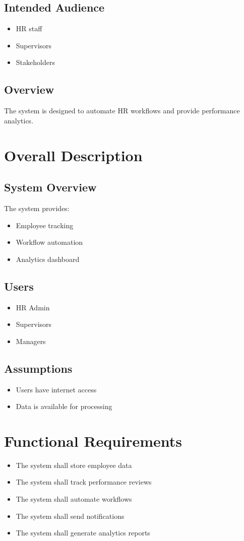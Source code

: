 \documentclass[12pt]{article}
\begin{document}
\subsection{Intended Audience}
\begin{itemize}
\item HR staff
\item Supervisors
\item Stakeholders
\end{itemize}

\subsection{Overview}
The system is designed to automate HR workflows and provide performance analytics.

\section{Overall Description}

\subsection{System Overview}
The system provides:
\begin{itemize}
\item Employee tracking
\item Workflow automation
\item Analytics dashboard
\end{itemize}

\subsection{Users}
\begin{itemize}
\item HR Admin
\item Supervisors
\item Managers
\end{itemize}

\subsection{Assumptions}
\begin{itemize}
\item Users have internet access
\item Data is available for processing
\end{itemize}

\section{Functional Requirements}
\begin{itemize}
\item The system shall store employee data
\item The system shall track performance reviews
\item The system shall automate workflows
\item The system shall send notifications
\item The system shall generate analytics reports
\end{itemize}
\end{document}
